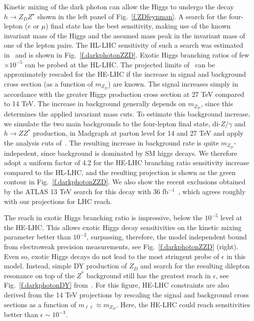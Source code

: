 Kinetic mixing of the dark photon can allow the Higgs to undergo the decay $h \to Z_D Z^{\star}$ shown in the left panel of Fig.~\ref{f.ZDfeynman}. A search for the four-lepton ($e$ or $\mu$) final state has the best sensitivity, making use of the known invariant mass of the Higgs and the assumed mass peak in the invariant mass of one of the lepton pairs. The HL-LHC sensitivity of such a search was estimated in~\cite{Curtin:2014cca} and is shown in Fig.~\ref{f.darkphotonZZD}. 
%
Exotic Higgs branching ratios of few$\times 10^{-5}$ can be probed at the HL-LHC. 
%
The projected limits of~\cite{Curtin:2014cca} can be approximately rescaled for the HE-LHC if the increase in signal and background cross section (as a function of $m_{Z_D}$) are known. 
%
The signal increases simply in accordance with the greater Higgs production cross section at 27 TeV compared to 14 TeV.
%
The increase in background generally depends on $m_{Z_D}$, since this determines the applied invariant mass cuts. To estimate this background increase, we simulate the two main backgrounds to the four-lepton final state, di-$Z/\gamma$ and $h \to Z Z^*$ production, in Madgraph at parton level for 14 and 27 TeV and apply the analysis cuts of~\cite{Curtin:2014cca}.
%
The resulting increase in background rate is quite $m_{Z_D}$-indepedent, since background is dominated by SM higgs decays. We therefore adopt a uniform factor of 4.2  for the HE-LHC branching ratio sensitivity increase compared to the HL-LHC, and the resulting projection is shown as the green contour in Fig.~\ref{f.darkphotonZZD}.
%
We also show the recent exclusions obtained by the ATLAS 13 TeV search for this decay with 36 fb$^{-1}$~\cite{Aaboud:2018fvk}, which agrees roughly with our projections for LHC reach. 


The reach in exotic Higgs branching ratio is impressive, below the $10^{-5}$ level at the HE-LHC.
This allows exotic Higgs decay sensitivities on the kinetic mixing parameter better than $10^{-2}$, surpassing, therefore, the model independent bound from electroweak precision measurements, %
see Fig.~\ref{f.darkphotonZZD} (right). 
%
Even so, exotic Higgs decays do not lead to the most stringent probe of $\epsilon$ in this model. Instead, simple DY production of $Z_D$ and search for the resulting dilepton resonance on top of the $Z^*$ background still has the greatest reach in $\epsilon$, see Fig.~\ref{f.darkphotonDY} from~\cite{Curtin:2014cca}. For this figure, HE-LHC constraints are also derived from the 14 TeV projections by rescaling the signal and background cross sections as a function of $m_{\ell \ell} \approx m_{Z_D}$. Here, the HE-LHC could reach sensitivities better than $\epsilon \sim 10^{-3}$. 


